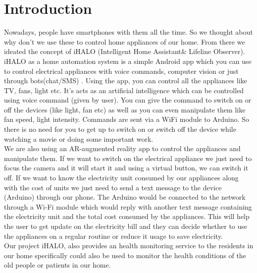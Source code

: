\chapter{Introduction}
\thispagestyle{fancy}
Nowadays, people have smartphones with them all the time. So we thought about why don't we use these to control home appliances of our home. From there we ideated the concept of iHALO (Intelligent Home Assistant\& Lifeline Observer). iHALO as a home automation system is a simple Android app which you can use to control electrical appliances with voice commands, computer vision or just through bots(chat/SMS) . Using the app, you can control all the appliances like TV, fans, light etc. It’s acts as an artificial intelligence which can be controlled using voice command (given by user). You can give the command to switch on or off the devices (like light, fan etc) as well as you can even manipulate them like fan speed, light intensity. Commands are sent via a WiFi module to Arduino. So there is no need for you to get up to switch on or switch off the device while watching a movie or doing some important work.\\
We are also using an AR-augmented reality app to control the appliances and manipulate them. If we want to switch on the electrical appliance we just need to focus the camera and it will start it and using a virtual button, we can switch it off. If we want to know the electricity unit consumed by our appliances along with the cost of units we just need to send a text message to the device (Arduino) through our phone. The Arduino would be connected to the network through a Wi-Fi module which would reply with another text message containing the electricity unit and the total cost consumed by the appliances. This will help the user to get update on the electricity bill and they can decide whether to use the appliances on a regular routine or reduce it usage to save electricity.\\
Our project iHALO, also provides an health monitoring service to the residents in our home specifically could also be used to monitor the health conditions of the old people or patients in our home.
